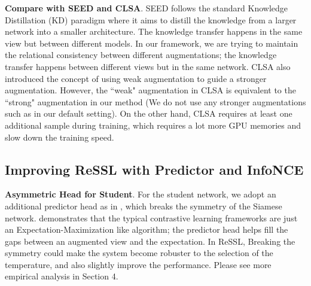 \documentclass{article}
\newcommand{\<}{\left\langle}
\renewcommand{\>}{\right\rangle}
\begin{document}
\textbf{Compare with SEED and CLSA}.  SEED \cite{seed} follows the standard Knowledge Distillation (KD) paradigm \cite{hinton2015distilling,you2017learning,du2020agree} where it aims to distill the knowledge from a larger network into a smaller architecture. The knowledge transfer happens in the same view but between different models. In our framework, we are trying to maintain the relational consistency between different augmentations; the knowledge transfer happens between different views but in the same network. CLSA \cite{stronger} also introduced the concept of using weak augmentation to guide a stronger augmentation. However, the ``weak" augmentation in CLSA is equivalent to the ``strong" augmentation in our method (We do not use any stronger augmentations such as \cite{autoaugment, randaugment} in our default setting). On the other hand, CLSA requires at least one additional sample during training, which requires a lot more GPU memories and slow down the training speed.

\subsection{Improving ReSSL with Predictor and InfoNCE}
\textbf{Asymmetric Head for Student}. For the student network, we adopt an additional predictor head as in \cite{byol,SimSiam}, which breaks the symmetry of the Siamese network. \cite{SimSiam} demonstrates that the typical contrastive learning frameworks are just an Expectation-Maximization like algorithm; the predictor head helps fill the gaps between an augmented view and the expectation. In ReSSL,  Breaking the symmetry could make the system become robuster to the selection of the temperature, and also slightly improve the performance. Please see more empirical analysis in Section 4. 
\end{document}

